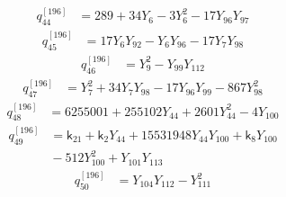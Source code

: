 \begin{equation}\label{q196:row:044}
\begin{aligned}
q_{44}^{[196]} &={} 289 + 34Y_{6} - 3Y_{6}^{2} - 17Y_{96}Y_{97}
\end{aligned}
\end{equation}
\begin{equation}\label{q196:row:045}
\begin{aligned}
q_{45}^{[196]} &={} 17Y_{6}Y_{92} - Y_{6}Y_{96} - 17Y_{7}Y_{98}
\end{aligned}
\end{equation}
\begin{equation}\label{q196:row:046}
\begin{aligned}
q_{46}^{[196]} &={} Y_{9}^{2} - Y_{99}Y_{112}
\end{aligned}
\end{equation}
\begin{equation}\label{q196:row:047}
\begin{aligned}
q_{47}^{[196]} &={} Y_{7}^{2} + 34Y_{7}Y_{98} - 17Y_{96}Y_{99} - 867Y_{98}^{2}
\end{aligned}
\end{equation}
\begin{equation}\label{q196:row:048}
\begin{aligned}
q_{48}^{[196]} &={} 6255001 + 255102Y_{44} + 2601Y_{44}^{2} - 4Y_{100}
\end{aligned}
\end{equation}
\begin{equation}\label{q196:row:049}
\begin{aligned}
q_{49}^{[196]} &={} \mathsf{k}_{21} + \mathsf{k}_{2}Y_{44} + 15531948Y_{44}Y_{100} + \mathsf{k}_{8}Y_{100}\\
&{} - 512Y_{100}^{2} + Y_{101}Y_{113}
\end{aligned}
\end{equation}
\begin{equation}\label{q196:row:050}
\begin{aligned}
q_{50}^{[196]} &={} Y_{104}Y_{112} - Y_{111}^{2}
\end{aligned}
\end{equation}
